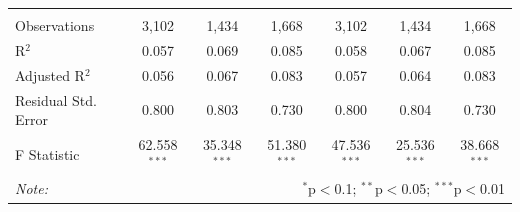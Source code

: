 \documentclass[alpha-refs]{wiley-article-01g}
\begin{document}
\begin{landscape}
\begin{table}[!htbp]
\begin{tabular}{@{\extracolsep{5pt}}lcccccc}
  & & & & & & \\ 
\hline \\[-.8ex] 
Observations & 3,102 & 1,434 & 1,668 & 3,102 & 1,434 & 1,668 \\ 
R$^{2}$ & 0.057 & 0.069 & 0.085 & 0.058 & 0.067 & 0.085 \\ 
Adjusted R$^{2}$ & 0.056 & 0.067 & 0.083 & 0.057 & 0.064 & 0.083 \\ 
Residual Std. Error & 0.800 & 0.803 & 0.730 & 0.800 & 0.804 & 0.730 \\ 
F Statistic & 62.558$^{***}$ & 35.348$^{***}$ & 51.380$^{***}$ & 47.536$^{***}$ & 25.536$^{***}$ & 38.668$^{***}$ \\ 
\hline 
\textit{Note:}  & \multicolumn{6}{r}{$^{*}$p$<$0.1; $^{**}$p$<$0.05; $^{***}$p$<$0.01} \\ 
\end{tabular} 
\end{table} 

\end{landscape}

\newpage
\end{document}
